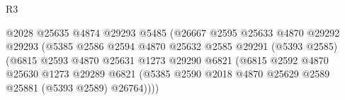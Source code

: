 \begin{lexlean}{R3}
\begin{coremodule}
                                                  @2028
                                                  @25635
                                                  @4874
                                                  @29293
                                                  @5485
                                                  (@26667
                                                    @2595
                                                    @25633
                                                    @4870
                                                    @29292
                                                    @29293
                                                    (@5385
                                                      @2586
                                                      @2594
                                                      @4870
                                                      @25632
                                                      @2585
                                                      @29291
                                                      (@5393 @2585)
                                                      (@6815
                                                        @2593
                                                        @4870
                                                        @25631
                                                        @1273
                                                        @29290
                                                        @6821
                                                        (@6815
                                                          @2592
                                                          @4870
                                                          @25630
                                                          @1273
                                                          @29289
                                                          @6821
                                                          (@5385
                                                            @2590
                                                            @2018
                                                            @4870
                                                            @25629
                                                            @2589
                                                            @25881
                                                            (@5393 @2589)
                                                            @26764))))

\end{coremodule}
\end{lexlean}
